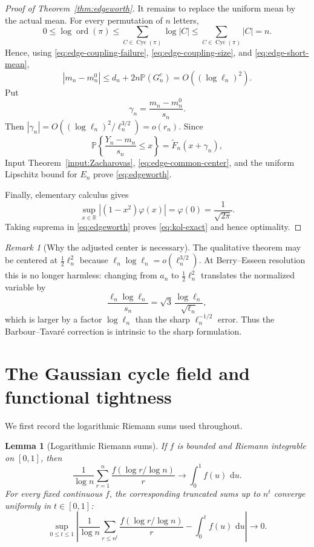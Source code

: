 \documentclass[11pt]{article}
\newtheorem{lemma}[theorem]{Lemma}
\theoremstyle{definition}
\theoremstyle{remark}
\newtheorem{remark}[theorem]{Remark}
\newcommand{\Pp}{\mathbb P}
\newcommand{\dd}{\,\mathrm d}
\newcommand{\ord}{\operatorname{ord}}
\newcommand{\Cyc}{\operatorname{Cyc}}
\newcommand{\R}{\mathbb R}
\begin{document}
\begin{proof}[Proof of Theorem~\ref{thm:edgeworth}]
It remains to replace the uniform mean by the actual mean.  For every
permutation of $n$ letters,
\[
 0\le\log\ord(\pi)
 \le\sum_{C\in\Cyc(\pi)}\log|C|
 \le\sum_{C\in\Cyc(\pi)}|C|=n.
\]
Hence, using \eqref{eq:edge-coupling-failure},
\eqref{eq:edge-coupling-size}, and \eqref{eq:edge-short-mean},
\begin{equation}\label{eq:mean-transfer-edge}
 |m_n-m_n^0|
 \le d_n+2n\Pp(G_n^c)
 =O((\log\ell_n)^2).
\end{equation}
Put
\[
 \gamma_n=\frac{m_n-m_n^0}{s_n}.
\]
Then $|\gamma_n|=O((\log\ell_n)^2/\ell_n^{3/2})=o(r_n)$.  Since
\[
 \Pp\left\{\frac{Y_n-m_n}{s_n}\le x\right\}
 =\widetilde F_n(x+\gamma_n),
\]
Input Theorem~\ref{input:Zacharovas},
\eqref{eq:edge-common-center}, and the uniform Lipschitz bound for $E_n$
prove \eqref{eq:edgeworth}.

Finally, elementary calculus gives
\[
 \sup_{x\in\R}|(1-x^2)\varphi(x)|=\varphi(0)=\frac1{\sqrt{2\pi}}.
\]
Taking suprema in \eqref{eq:edgeworth} proves
\eqref{eq:kol-exact} and hence optimality.
\end{proof}

\begin{remark}[Why the adjusted center is necessary]
The qualitative theorem may be centered at $\frac12\ell_n^2$ because
$\ell_n\log\ell_n=o(\ell_n^{3/2})$.  At Berry--Esseen resolution this is
no longer harmless: changing from $a_n$ to $\frac12\ell_n^2$ translates
the normalized variable by
\[
 \frac{\ell_n\log\ell_n}{s_n}
 =\sqrt3\,\frac{\log\ell_n}{\sqrt{\ell_n}},
\]
which is larger by a factor $\log\ell_n$ than the sharp
$\ell_n^{-1/2}$ error.  Thus the Barbour--Tavar\'e correction is intrinsic
to the sharp formulation.
\end{remark}

\section{The Gaussian cycle field and functional tightness}

We first record the logarithmic Riemann sums used throughout.

\begin{lemma}[Logarithmic Riemann sums]\label{lem:riemann}
If $f$ is bounded and Riemann integrable on $[0,1]$, then
\[
 \frac1{\log n}
 \sum_{r=1}^n\frac{f(\log r/\log n)}r
 \longrightarrow
 \int_0^1f(u)\,\dd u.
\]
For every fixed continuous $f$, the corresponding truncated sums up to
$n^t$ converge uniformly in $t\in[0,1]$:
\[
 \sup_{0\le t\le1}
 \left|
 \frac1{\log n}
 \sum_{r\le n^t}\frac{f(\log r/\log n)}r
 -
 \int_0^t f(u)\,\dd u
 \right|
 \longrightarrow0.
\]
\end{lemma}
\end{document}
